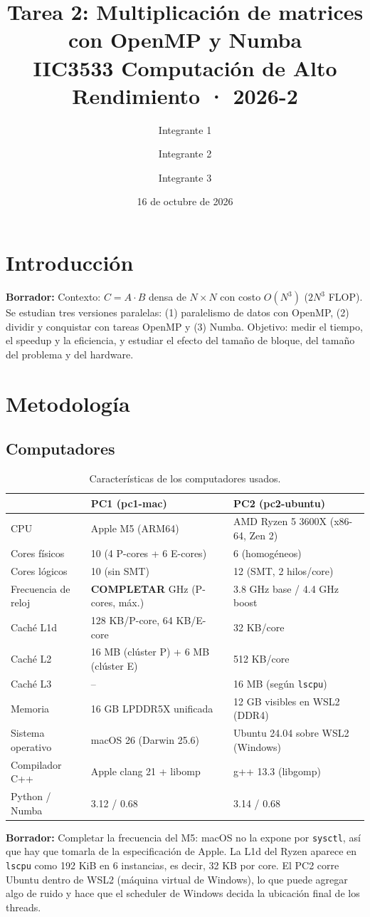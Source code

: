 \documentclass[11pt,a4paper]{article}
\title{Tarea 2: Multiplicación de matrices con OpenMP y Numba\\
\large IIC3533 Computación de Alto Rendimiento · 2026-2}
\author{Integrante 1 \and Integrante 2 \and Integrante 3}
\date{16 de octubre de 2026}
\newcommand{\pcA}{pc1-mac}
\newcommand{\pcB}{pc2-ubuntu}
\newcommand{\nota}[1]{\par\noindent\colorbox{yellow!25}{\parbox{\dimexpr\linewidth-2\fboxsep}{\small\textbf{Borrador:} #1}}\par}
\begin{document}
\maketitle

\section{Introducción}
\nota{Contexto: $C=A\cdot B$ densa de $N\times N$ con costo $O(N^3)$ ($2N^3$ FLOP). Se estudian tres versiones paralelas: (1) paralelismo de datos con OpenMP, (2) dividir y conquistar con tareas OpenMP y (3) Numba. Objetivo: medir el tiempo, el speedup y la eficiencia, y estudiar el efecto del tamaño de bloque, del tamaño del problema y del hardware.}

\section{Metodología}
\subsection{Computadores}
\begin{table}[H]
\centering\small
\caption{Características de los computadores usados.}
\label{tab:maquinas}
\begin{tabular}{lll}
\toprule
 & \textbf{PC1 (\pcA)} & \textbf{PC2 (\pcB)} \\
\midrule
CPU & Apple M5 (ARM64) & AMD Ryzen 5 3600X (x86-64, Zen 2) \\
Cores físicos & 10 (4 P-cores + 6 E-cores) & 6 (homogéneos) \\
Cores lógicos & 10 (sin SMT) & 12 (SMT, 2 hilos/core) \\
Frecuencia de reloj & \textbf{COMPLETAR} GHz (P-cores, máx.) & 3.8 GHz base / 4.4 GHz boost \\
Caché L1d & 128 KB/P-core, 64 KB/E-core & 32 KB/core \\
Caché L2 & 16 MB (clúster P) + 6 MB (clúster E) & 512 KB/core \\
Caché L3 & -- & 16 MB (según \texttt{lscpu}) \\
Memoria & 16 GB LPDDR5X unificada & 12 GB visibles en WSL2 (DDR4) \\
Sistema operativo & macOS 26 (Darwin 25.6) & Ubuntu 24.04 sobre WSL2 (Windows) \\
Compilador C++ & Apple clang 21 + libomp & g++ 13.3 (libgomp) \\
Python / Numba & 3.12 / 0.68 & 3.14 / 0.68 \\
\bottomrule
\end{tabular}
\end{table}
\nota{Completar la frecuencia del M5: macOS no la expone por \texttt{sysctl}, así que hay que tomarla de la especificación de Apple. La L1d del Ryzen aparece en \texttt{lscpu} como 192 KiB en 6 instancias, es decir, 32 KB por core. El PC2 corre Ubuntu dentro de WSL2 (máquina virtual de Windows), lo que puede agregar algo de ruido y hace que el scheduler de Windows decida la ubicación final de los threads.}
\end{document}
